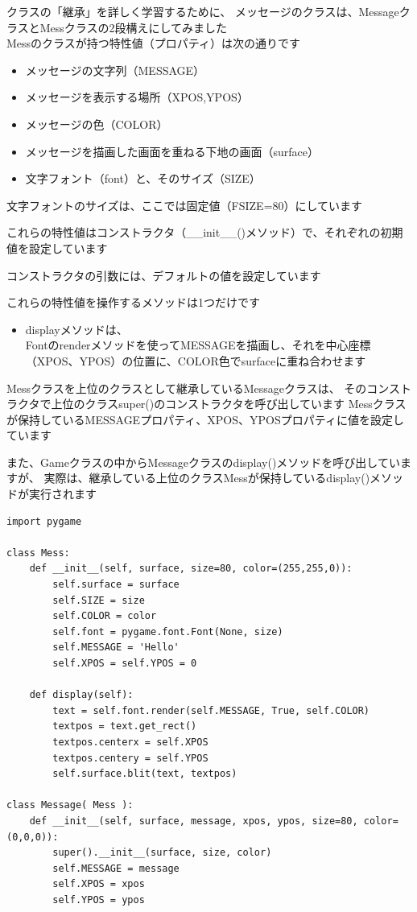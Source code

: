 \documentclass[uplatex,a4paper,11pt,oneside,openany]{jsbook}
\begin{document}
クラスの「継承」を詳しく学習するために、
メッセージのクラスは、MessageクラスとMessクラスの2段構えにしてみました\\

Messのクラスが持つ特性値（プロパティ）は次の通りです

\begin{itemize}
  \item メッセージの文字列（MESSAGE）
  \item メッセージを表示する場所（XPOS,YPOS）
  \item メッセージの色（COLOR）
  \item メッセージを描画した画面を重ねる下地の画面（surface）
  \item 文字フォント（font）と、そのサイズ（SIZE）
\end{itemize}

文字フォントのサイズは、ここでは固定値（FSIZE=80）にしています

これらの特性値はコンストラクタ（\_\_init\_\_()メソッド）で、それぞれの初期値を設定しています

コンストラクタの引数には、デフォルトの値を設定しています

これらの特性値を操作するメソッドは1つだけです

\begin{itemize}
  \item displayメソッドは、\\Fontのrenderメソッドを使ってMESSAGEを描画し、それを中心座標（XPOS、YPOS）の位置に、COLOR色でsurfaceに重ね合わせます
\end{itemize}

Messクラスを上位のクラスとして継承しているMessageクラスは、
そのコンストラクタで上位のクラスsuper()のコンストラクタを呼び出しています
Messクラスが保持しているMESSAGEプロパティ、XPOS、YPOSプロパティに値を設定しています

また、Gameクラスの中からMessageクラスのdisplay()メソッドを呼び出していますが、
実際は、継承している上位のクラスMessが保持しているdisplay()メソッドが実行されます

\begin{lstlisting}[caption=Messageクラス,label=p4]
import pygame

class Mess:
    def __init__(self, surface, size=80, color=(255,255,0)):
        self.surface = surface
        self.SIZE = size
        self.COLOR = color
        self.font = pygame.font.Font(None, size)
        self.MESSAGE = 'Hello'
        self.XPOS = self.YPOS = 0

    def display(self):
        text = self.font.render(self.MESSAGE, True, self.COLOR)
        textpos = text.get_rect()
        textpos.centerx = self.XPOS
        textpos.centery = self.YPOS
        self.surface.blit(text, textpos)

class Message( Mess ):
    def __init__(self, surface, message, xpos, ypos, size=80, color=(0,0,0)):
        super().__init__(surface, size, color)
        self.MESSAGE = message
        self.XPOS = xpos
        self.YPOS = ypos
\end{lstlisting}
\end{document}
